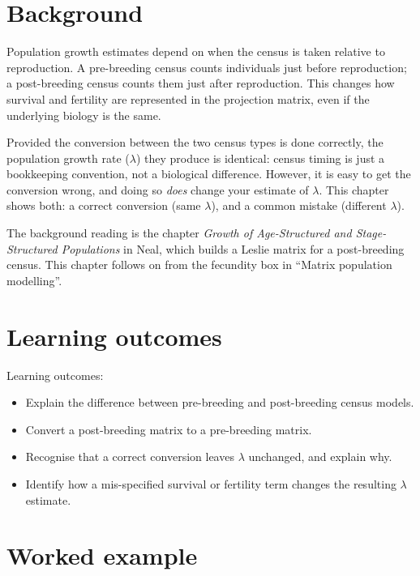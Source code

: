 \documentclass[
  a4paper]{book}
\providecommand{\tightlist}{%
  \setlength{\itemsep}{0pt}\setlength{\parskip}{0pt}}
\begin{document}
\section{Background}\label{background-9}

Population growth estimates depend on when the census is taken relative to reproduction. A pre-breeding census counts individuals just before reproduction; a post-breeding census counts them just after reproduction. This changes how survival and fertility are represented in the projection matrix, even if the underlying biology is the same.

Provided the conversion between the two census types is done correctly, the population growth rate (\(\lambda\)) they produce is identical: census timing is just a bookkeeping convention, not a biological difference. However, it is easy to get the conversion wrong, and doing so \emph{does} change your estimate of \(\lambda\). This chapter shows both: a correct conversion (same \(\lambda\)), and a common mistake (different \(\lambda\)).

The background reading is the chapter \emph{Growth of Age-Structured and Stage-Structured Populations} in Neal, which builds a Leslie matrix for a post-breeding census. This chapter follows on from the fecundity box in ``Matrix population modelling''.

\section{Learning outcomes}\label{learning-outcomes-2}

Learning outcomes:

\begin{itemize}
\tightlist
\item
  Explain the difference between pre-breeding and post-breeding census models.
\item
  Convert a post-breeding matrix to a pre-breeding matrix.
\item
  Recognise that a correct conversion leaves \(\lambda\) unchanged, and explain why.
\item
  Identify how a mis-specified survival or fertility term changes the resulting \(\lambda\) estimate.
\end{itemize}

\section{Worked example}\label{worked-example-7}
\end{document}
